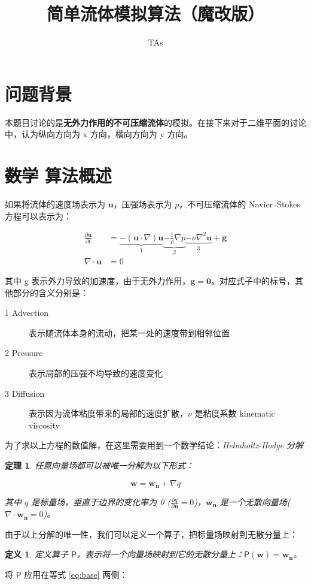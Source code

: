 \documentclass{ctexart}
\title{简单流体模拟算法（魔改版）}
\author{TAs}
\newtheorem*{theorem}{定理}
\newtheorem*{definition}{定义}
\begin{document}
\maketitle

\section{问题背景}

\label{sec:bg}

本题目讨论的是\textbf{无外力作用的不可压缩流体}的模拟。在接下来对于二维平面的讨论中，认为纵向方向为 x 方向，横向方向为 y 方向。

\section{\sout{数学} 算法概述}

如果将流体的速度场表示为 $\mathbf{u}$，压强场表示为 $p$，不可压缩流体的 Navier–Stokes 方程可以表示为：

\begin{equation}
\begin{split}
\label{eq:base}
\frac{\partial \mathbf{u}}{\partial t} & = \underbrace{- (\mathbf{u} \cdot \nabla) \mathbf{u}}_1 \underbrace{- \frac{1}{\rho} \nabla p}_2 \underbrace{- \nu \nabla^2 \mathbf{u}}_3 + \mathbf{g} \\
\nabla \cdot \mathbf{u} & = 0
\end{split}
\end{equation}

其中 g 表示外力导致的加速度，由于无外力作用，$\mathbf{g} = \mathbf{0}$。对应式子中的标号，其他部分的含义分别是：

\begin{description}
  \item[1 Advection] 表示随流体本身的流动，把某一处的速度带到相邻位置
  \item[2 Pressure] 表示局部的压强不均导致的速度变化
  \item[3 Diffusion] 表示因为流体粘度带来的局部的速度扩散，$\nu$ 是粘度系数 kinematic viscosity
\end{description}
为了求以上方程的数值解，在这里需要用到一个数学结论：\textit{Helmholtz-Hodge 分解}

\begin{theorem}
任意向量场都可以被唯一分解为以下形式：

\begin{equation}
\label{eq:p-operator}
\mathbf{w} = \mathbf{w_n} + \nabla q
\end{equation}

其中 $q$ 是标量场，垂直于边界的变化率为 0 ($\frac{\partial q}{\partial \mathbf{n}} = 0$)，$\mathbf{w_n}$ 是一个无散向量场($\nabla \cdot \mathbf{w_n} = 0$)。
\end{theorem}
由于以上分解的唯一性，我们可以定义一个算子，把标量场映射到无散分量上：
\begin{definition}
  定义算子 $\mathsf{P}$，表示将一个向量场映射到它的无散分量上：$\mathsf{P}(\mathbf{w}) = \mathbf{w_n}$。
\end{definition}
将 $\mathsf{P}$ 应用在等式 \ref{eq:base} 两侧：
\end{document}
